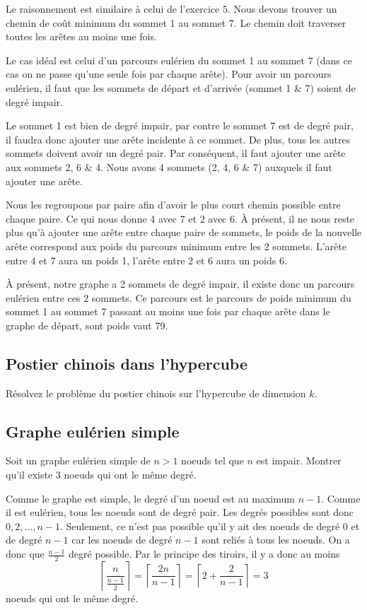\begin{solution}
Le raisonnement est similaire à celui de l'exercice 5. Nous devons
trouver un chemin de coût minimum du sommet 1 au sommet 7. Le chemin
doit traverser toutes les arêtes au moins une fois. 

Le cas idéal est celui d'un parcours eulérien du sommet 1 au sommet 7 (dans ce cas
on ne passe qu'une seule fois par chaque arête). Pour avoir un parcours
eulérien, il faut que les sommets de départ et d'arrivée (sommet 1
\& 7) soient de degré impair. 

Le sommet 1 est bien de degré impair,
par contre le sommet 7 est de degré pair, il faudra donc ajouter une
arête incidente à ce sommet. De plus, tous les autres sommets doivent
avoir un degré pair. Par conséquent, il faut ajouter une arête aux
sommets 2, 6 \& 4. Nous avons 4 sommets (2, 4, 6 \& 7) auxquels il faut
ajouter une arête. 

Nous les regroupons par paire afin d'avoir le plus
court chemin possible entre chaque paire. Ce qui nous donne 4 avec
7 et 2 avec 6. À présent, il ne nous reste plus qu'à ajouter une arête
entre chaque paire de sommets, le poids de la nouvelle arête correspond
aux poids du parcours minimum entre les 2 sommets. L'arête entre 4
et 7 aura un poids 1, l'arête entre 2 et 6 aura un poids 6. 

À présent, notre graphe a 2 sommets de degré impair, il existe donc un parcours
eulérien entre ces 2 sommets. Ce parcours est le parcours de poids
minimum du sommet 1 au sommet 7 passant au moins une fois par chaque
arête dans le graphe de départ, sont poids vaut 79.
\end{solution}

\subsection{Postier chinois dans l'hypercube} Résolvez le problème du postier chinois sur l'hypercube de dimension $k$.

\subsection{Graphe eulérien simple}
Soit un graphe eulérien simple de $n > 1$ noeuds tel que $n$ est impair.
Montrer qu'il existe 3 noeuds qui ont le même degré.

\begin{solution}
  Comme le graphe est simple, le degré d'un noeud est au maximum $n-1$.
  Comme il est eulérien, tous les noeuds sont de degré pair.
  Les degrés possibles sont donc $0, 2, \ldots, n-1$.
  Seulement, ce n'est pas possible qu'il y ait des noeuds de degré 0 et de degré $n-1$
  car les noeuds de degré $n-1$ sont reliés à tous les noeuds.
  On a donc que $\frac{n-1}{2}$ degré possible.
  Par le principe des tiroirs, il y a donc au moins
  $$\left\lceil \frac{n}{\frac{n-1}{2}} \right\rceil = \left\lceil \frac{2n}{n-1} \right\rceil
  = \left\lceil 2 + \frac{2}{n-1} \right\rceil = 3$$
  noeuds qui ont le même degré.
\end{solution}
